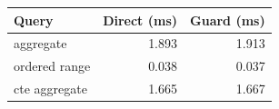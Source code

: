 \begin{tabular}{lrr}
\toprule
Query & Direct (ms) & Guard (ms) \\
\midrule
aggregate & 1.893 & 1.913 \\
ordered range & 0.038 & 0.037 \\
cte aggregate & 1.665 & 1.667 \\
\bottomrule
\end{tabular}
